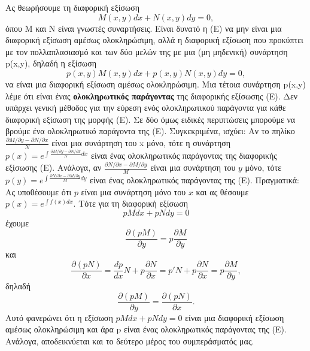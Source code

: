 \documentclass[11pt,a4paper,twoside]{book}
\begin{document}
Ας θεωρήσουμε τη διαφορική εξίσωση
\begin{equation}\label{eq:integrating_factor}
M(x,y)dx+N(x,y)dy=0, \tag{E}
\end{equation}
όπου M και N είναι γνωστές συναρτήσεις. Είναι δυνατό η (Ε) να μην είναι μια διαφορική εξίσωση αμέσως ολοκληρώσιμη, αλλά η διαφορική εξίσωση που προκύπτει με τον πολλαπλασιασμό και των δύο μελών της με μια (μη μηδενική) συνάρτηση p(x,y), δηλαδή η εξίσωση
\[
p(x,y)M(x,y)dx+p(x,y)N(x,y)dy=0,
\]
να είναι μια διαφορική εξίσωση αμέσως ολοκληρώσιμη. Μια τέτοια συνάρτηση p(x,y) λέμε ότι είναι ένας \textbf{ολοκληρωτικός παράγοντας} της διαφορικής εξίσωσης (Ε).
Δεν υπάρχει γενική μέθοδος για την εύρεση ενός ολοκληρωτικού παράγοντα για κάθε διαφορική εξίσωση της μορφής (Ε). Σε δύο όμως ειδικές περιπτώσεις μπορούμε να βρούμε ένα ολοκληρωτικό παράγοντα της (Ε). Συγκεκριμένα, ισχύει:
Αν το πηλίκο $\frac{\partial M/\partial y - \partial N/\partial x}{N}$ είναι μια συνάρτηση του x μόνο, τότε η συνάρτηση $p(x)=e^{\int \frac{\partial M/\partial y - \partial N/\partial x}{N}dx}$ είναι ένας ολοκληρωτικός παράγοντας της διαφορικής εξίσωσης (Ε). Ανάλογα, αν $\frac{\partial N/\partial x - \partial M/\partial y}{M}$ είναι μια συνάρτηση του $y$ μόνο, τότε $p(y)=e^{\int \frac{\partial N/\partial x - \partial M/\partial y}{M}dy}$ είναι ένας ολοκληρωτικός παράγοντας της (Ε). Πραγματικά: Ας υποθέσουμε ότι $p$ είναι μια συνάρτηση μόνο του $x$ και ας θέσουμε $p(x)=e^{\int f(x)dx}$. Τότε για τη διαφορική εξίσωση
\[
pMdx+pNdy=0
\]
έχουμε
\[
\frac{\partial (pM)}{\partial y} = p\frac{\partial M}{\partial y}
\]
και
\[
\frac{\partial (pN)}{\partial x} = \frac{dp}{dx}N+p\frac{\partial N}{\partial x} = p'N+p\frac{\partial N}{\partial x} = p\frac{\partial M}{\partial y},
\]
δηλαδή
\[
\frac{\partial (pM)}{\partial y} = \frac{\partial (pN)}{\partial x}.
\]
Αυτό φανερώνει ότι η εξίσωση $pMdx+pNdy=0$ είναι μια διαφορική εξίσωση αμέσως ολοκληρώσιμη και άρα p είναι ένας ολοκληρωτικός παράγοντας της (Ε). Ανάλογα, αποδεικνύεται και το δεύτερο μέρος του συμπεράσματός μας.
\end{document}
